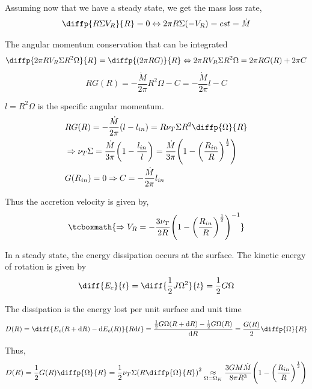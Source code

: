 \documentclass[10pt,a4paper,english]{article}
\let\originalleft\left
\let\originalright\right
\renewcommand{\left}{\mathopen{}\mathclose\bgroup\originalleft}
\renewcommand{\right}{\aftergroup\egroup\originalright}
\begin{document}
Assuming now that we have a steady state, we get the mass loss rate,
\begin{equation}
    \diffp{R \Sigma V_R}{R} = 0 \Leftrightarrow 2 \pi R \Sigma (- V_R) = cst = \dot{M}
\end{equation}

The angular momentum conservation that can be integrated
\begin{equation}
    \diffp{2 \pi R V_R \Sigma R^2 \Omega}{R} = \diffp{(2 \pi R G)}{R} \Leftrightarrow 2 \pi R V_R \Sigma R^2 \Omega = 2 \pi R G(R) + 2 \pi C
\end{equation}
\begin{equation*}
    R G(R) = - \frac{\dot{M}}{2 \pi} R^2 \Omega - C = - \frac{\dot{M}}{2 \pi} l - C
\end{equation*}

$l = R^2 \Omega$ is the specific angular momentum.
\begin{align*}
    & RG(R) = - \frac{\dot{M}}{2 \pi} (l - l_{in}) = R \nu_T \Sigma R^2 \diffp{\Omega}{R} \\
    & \Rightarrow \nu_T \Sigma = \frac{\dot{M}}{3 \pi} \left(1 - \frac{l_{in}}{l}\right) =
    \frac{\dot{M}}{3 \pi} \left(1 - \left(\frac{R_{in}}{R}\right)^\frac{1}{2}\right) \\
    &G(R_{in}) = 0 \Rightarrow C = - \frac{\dot{M}}{2 \pi} l_{in}
\end{align*}

Thus the accretion velocity is given by,
\begin{equation}
    \tcboxmath{
        \Rightarrow V_R = - \frac{3 \nu_T}{2 R} \left(1 - \left(\frac{R_{in}}{R}\right)^\frac{1}{2}\right)^{-1}
    }
\end{equation}

In a steady state, the energy dissipation occurs at the surface. The kinetic
energy of rotation is given by
\begin{equation*}
    \diff{E_c}{t} = \diff{\frac{1}{2} J \Omega^2}{t} = \frac{1}{2} G \Omega
\end{equation*}

The dissipation is the energy lost per unit surface and unit time
\begin{equation*}
    D(R) = \diff{E_c(R+\d{R}) - \d{E_c(R)}}{R \d{t}} = \frac{\frac{1}{2} G \Omega(R+\d{R}) - \frac{1}{2} G \Omega(R)}{\d{R}} = \frac{G(R)}{2} \diffp{\Omega}{R}
\end{equation*}

Thus,
\begin{equation*}
    D(R) = \frac{1}{2} G(R) \diffp{\Omega}{R} = \frac{1}{2} \nu_T \Sigma \left( R \diffp{\Omega}{R} \right)^2 \underset{\Omega = \Omega_K}{\approx}
    \frac{3 G M \dot{M}}{8 \pi R^3} \left(1 - \left(\frac{R_{in}}{R}\right)^\frac{1}{2}\right)
\end{equation*}
\end{document}
